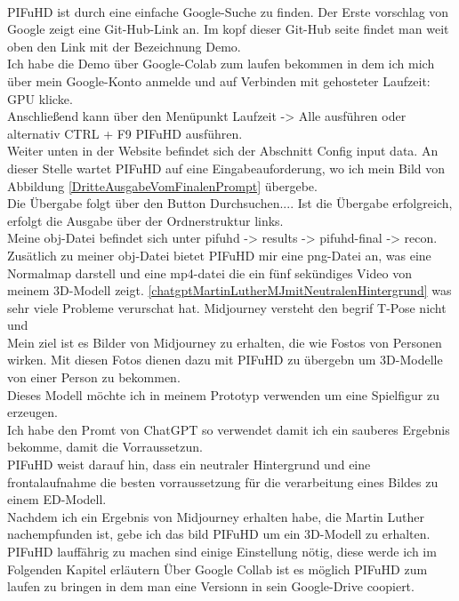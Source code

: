 \documentclass[10pt,a4paper,bibliography=totocnumbered,listof=totocnumbered]{scrartcl}
\begin{document}
\\
PIFuHD ist durch eine einfache Google-Suche zu finden. Der Erste vorschlag von Google zeigt eine Git-Hub-Link an. Im kopf dieser Git-Hub seite findet man weit oben den Link mit der Bezeichnung Demo.
\\
Ich habe die Demo über Google-Colab zum laufen bekommen in dem ich mich über mein Google-Konto anmelde und auf Verbinden mit gehosteter Laufzeit: GPU klicke.
\\
Anschließend kann über den Menüpunkt Laufzeit -> Alle ausführen oder alternativ CTRL + F9 PIFuHD ausführen.
\\
Weiter unten in der Website befindet sich der Abschnitt Config input data. An dieser Stelle wartet PIFuHD auf eine Eingabeauforderung, wo ich mein Bild von Abbildung \ref{DritteAusgabeVomFinalenPrompt} übergebe.
\\
Die Übergabe folgt über den Button Durchsuchen.... Ist die Übergabe erfolgreich, erfolgt die Ausgabe über der Ordnerstruktur links.
\\
Meine obj-Datei befindet sich unter pifuhd -> results -> pifuhd-final -> recon. Zusätlich zu meiner obj-Datei bietet PIFuHD mir eine png-Datei an, was eine Normalmap darstell und eine mp4-datei die ein fünf sekündiges Video von meinem 3D-Modell zeigt.
%
%
%
%
%
%
%
\ref{chatgptMartinLutherMJmitNeutralenHintergrund} was sehr viele Probleme verurschat hat. Midjourney versteht den begrif T-Pose nicht und 
\\
Mein ziel ist es Bilder von Midjourney zu erhalten, die wie Fostos von Personen wirken. Mit diesen Fotos dienen dazu mit PIFuHD zu übergebn um 3D-Modelle von einer Person zu bekommen.
\\
Dieses Modell möchte ich in meinem Prototyp verwenden um eine Spielfigur zu erzeugen.
\\
Ich habe den Promt von ChatGPT so verwendet damit ich ein sauberes Ergebnis bekomme, damit die Vorraussetzun.
\\
PIFuHD weist darauf hin, dass ein neutraler Hintergrund und eine frontalaufnahme die besten vorraussetzung für die verarbeitung eines Bildes zu einem ED-Modell.
\\
Nachdem ich ein Ergebnis von Midjourney erhalten habe, die Martin Luther nachempfunden ist, gebe ich das bild PIFuHD um ein 3D-Modell zu erhalten.
\\
PIFuHD lauffährig zu machen sind einige Einstellung nötig, diese werde ich im Folgenden Kapitel erläutern
Über Google Collab ist es möglich PIFuHD zum laufen zu bringen in dem man eine Versionn in sein Google-Drive coopiert.
\end{document}
